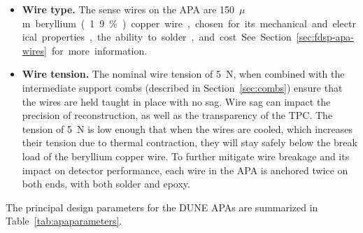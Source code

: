 \begin{itemize}
\begin{comment}
\begin{dunetable}[Baseline bias voltages for APA wire layers]{lr}{tab:bias}{Baseline bias voltages for APA wire layers.}   
Anode Plane & Bias Voltage  \\ \toprowrule
Grid (G) & -665 V\\ \colhline
Induction (U) & -370 V\\ \colhline
Induction (V) & 0 V\\ \colhline
Collection (X) & 820 V\\ \colhline
Mesh (M) & 0 V\\
\end{dunetable}

\begin{dunefigure}[Wire plane field lines and signal shapes]{fig:apa-fields}{Field lines and signal shapes on the APA induction and collection wires.}
\texttt{[image: APA-drawing-wire-field-signals.png]} 
\end{dunefigure}
\end{comment}

\item \textbf{Wire type.}  The sense wires on the APA are \SI{150}{$\mu$m} beryllium (1.9\%) copper wire, %
chosen for its mechanical and electrical properties, the ability to solder, and cost.  See Section~\ref{sec:fdsp-apa-wires} for more information.

\item \textbf{Wire tension.} The nominal wire tension of \SI{5}{N}, when combined with the intermediate support combs (described in Section~\ref{sec:combs}) ensure that the wires are held taught in place with no sag.  Wire sag can impact the precision of reconstruction, as well as the transparency of the TPC.  The tension of \SI{5}{N} is low enough that when the wires are cooled, which increases their tension due to thermal contraction, they will stay safely below the break load of the beryllium copper wire.  To further mitigate wire breakage and its impact on detector performance, each wire in the APA is anchored twice on both ends, with both solder and epoxy.

\end{itemize}


The principal design parameters for the DUNE APAs are summarized in Table~\ref{tab:apaparameters}.

